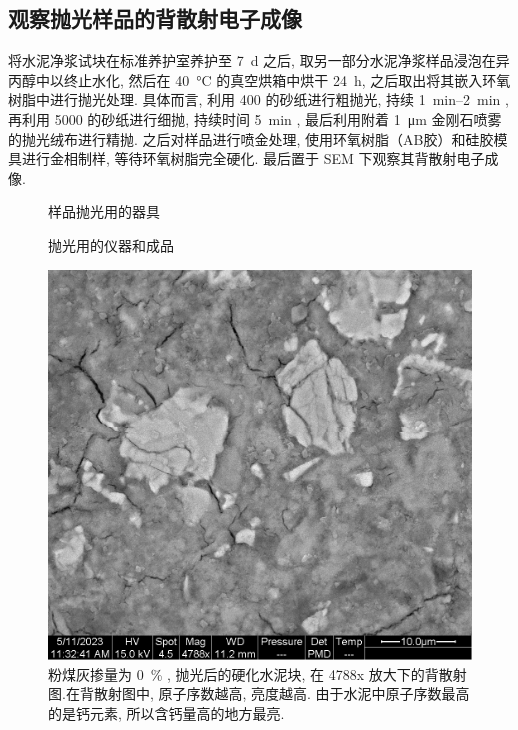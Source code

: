 \subsection{观察抛光样品的背散射电子成像}

将水泥净浆试块在标准养护室养护至 \SI{7}{\day} 之后, 取另一部分水泥净浆样品浸泡在异丙醇中以终止水化, 然后在 \SI{40}{\degreeCelsius} 的真空烘箱中烘干 \SI{24}{\hour}, 之后取出将其嵌入环氧树脂中进行抛光处理. 具体而言, 利用 \SI{400}{} 的砂纸进行粗抛光, 持续 \qtyrange{1}{2}{\minute} , 再利用 \SI{5000}{} 的砂纸进行细抛, 持续时间 \SI{5}{\minute} , 最后利用附着 \SI{1}{\micro\meter} 金刚石喷雾的抛光绒布进行精抛.
之后对样品进行喷金处理, 使用环氧树脂（AB胶）和硅胶模具进行金相制样, 等待环氧树脂完全硬化.
最后置于 SEM 下观察其背散射电子成像.

\begin{figure}[!t]
  \centering
   \quad
   \quad
  \caption{样品抛光用的器具}
\end{figure}

\begin{figure}[!t]
  \centering
   \quad
  \caption{抛光用的仪器和成品}
\end{figure}

\begin{figure}
  \centering
  \includegraphics[width = 0.4 \linewidth]{assets/00-polished-04788x-PMD.png}
  \caption{粉煤灰掺量为 \SI{0}{\percent} , 抛光后的硬化水泥块, 在 4788x 放大下的背散射图.在背散射图中, 原子序数越高, 亮度越高. 由于水泥中原子序数最高的是钙元素, 所以含钙量高的地方最亮. }
\end{figure}

